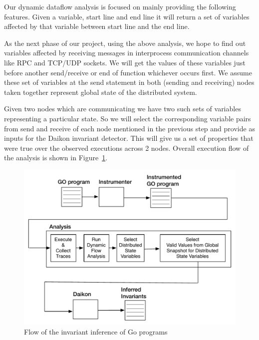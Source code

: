 Our dynamic dataflow analysis is focused on mainly providing the
following features. Given a variable, start line and end line it will
return a set of variables affected by that variable between start line
and the end line.

As the next phase of our project, using the above analysis, we hope to
find out variables affected by receiving messages in interprocess
communication channels like RPC and TCP/UDP sockets. We will get the
values of these variables just before another send/receive or end of
function whichever occurs first. We assume these set of variables at
the send statement in both (sending and receiving) nodes taken
together represent global state of the distributed system.

Given two nodes which are communicating we have two such sets of
variables representing a particular state. So we will select the
corresponding variable pairs from send and receive of each node
mentioned in the previous step and provide as inputs for the Daikon
invariant detector. This will give us a set of properties that were
true over the observed executions across 2 nodes. Overall execution
flow of the analysis is shown in Figure~\ref{fig:go_flow}.


\begin{figure}
  \includegraphics[width=\columnwidth]{go_flow.pdf}
  \caption{Flow of the invariant inference of Go programs}
  \label{fig:go_flow}
\end{figure}